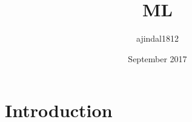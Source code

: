 \documentclass{article}
\title{ML}
\author{ajindal1812 }
\date{September 2017}
\begin{document}
\maketitle

\section{Introduction}
\end{document}
